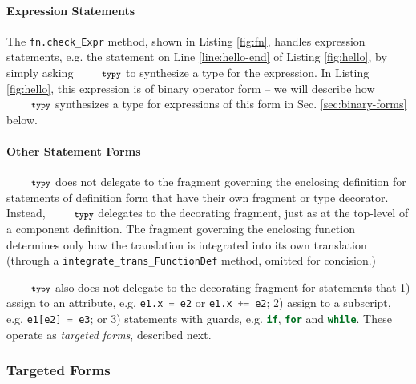 \documentclass[10pt]{sigplanconf}
\newcommand{\typy}{\texttt{\footnotesize typy}}
\newcommand{\lip}[1]{\lstinline[language=Python,basicstyle=\ttfamily\footnotesize,morekeywords={with},deletendkeywords={tuple,buffer,map}]{#1}}
\newcommand{\li}[1]{\lip{#1}}
\begin{document}
\paragraph{Expression Statements} The \li{fn.check_Expr} method, shown in Listing \ref{fig:fn}, handles expression statements, e.g. the statement on Line \ref{line:hello-end} of Listing \ref{fig:hello}, by simply asking $\typy$ to synthesize a type for the expression. In Listing \ref{fig:hello}, this expression is of binary operator form -- we will describe how $\typy$ synthesizes a type for expressions of this form in Sec. \ref{sec:binary-forms} below.

\paragraph{Other Statement Forms}
$\typy$ does not delegate to the fragment governing the enclosing definition for statements of definition form that have their own fragment or type decorator. Instead, $\typy$ delegates to the decorating fragment, just as at the top-level of a component definition. The fragment governing the enclosing function determines only how the translation is integrated into its own translation (through a \li{integrate_trans_FunctionDef} method, omitted for concision.)

$\typy$ also does not delegate to the decorating fragment for statements that 1) assign to an attribute, e.g. \li{e1.x = e2} or \li{e1.x += e2};  2) assign to a subscript, e.g. \li{e1[e2] = e3}; or 3) statements with guards, e.g. \li{if}, \li{for} and \li{while}.  These operate as \emph{targeted forms}, described next.

\subsubsection{Targeted Forms}\label{sec:targeted-forms}
\end{document}
